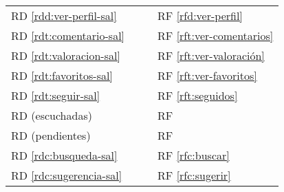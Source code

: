 \documentclass[
  12pt,
  a4paper,
  DIV=12,
  spanish,
]{scrartcl}
\newcounter{RF}
\newcounter{RD}
\begin{document}
\begin{tabularx}{\linewidth}{l|XXX}

  RD \ref{rdd:ver-perfil-sal} & & & RF \ref{rfd:ver-perfil} \\
  RD \ref{rdt:comentario-sal} & & & RF \ref{rft:ver-comentarios} \\
  RD \ref{rdt:valoracion-sal} & & & RF \ref{rft:ver-valoración} \\
  RD \ref{rdt:favoritos-sal} & & & RF \ref{rft:ver-favoritos} \\
  RD \ref{rdt:seguir-sal} & & & RF \ref{rft:seguidos} \\
  RD (escuchadas) & & & RF  \\
  RD (pendientes) & & & RF  \\
  RD \ref{rdc:busqueda-sal} & & & RF \ref{rfc:buscar} \\
  RD \ref{rdc:sugerencia-sal} & & & RF \ref{rfc:sugerir} \\

\end{tabularx}
\end{document}
